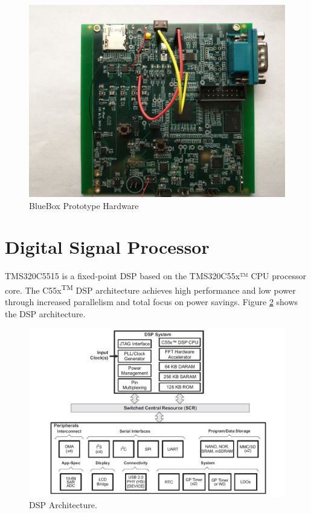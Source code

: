 \begin{figure}[h]
	\centering
	\includegraphics[scale = 0.08]{BlueBox_Hardware.jpg}
	\caption{BlueBox Prototype Hardware \label{BlueBox_Hardware}}
\end{figure} 
\section{Digital Signal Processor}
TMS320C5515 is a fixed-point DSP based on the TMS320C55x™ CPU processor core. The C55x\textsuperscript{TM} DSP architecture achieves high performance and low power through increased parallelism and total focus on power savings. Figure \ref{C5515 Architecture} shows the DSP architecture.

\begin{figure}[h]
	\centering
	\includegraphics[scale = 0.75 ]{C5515_arch.JPG}
	\caption{DSP Architecture. \cite{tms320c5515}\label{C5515 Architecture}}
\end{figure} 
